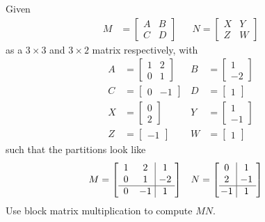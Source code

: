 \begin{exmp}
Given 
\begin{align*}
M &=
\begin{bmatrix}
A & B \\
C & D
\end{bmatrix} 
& &
N =
\begin{bmatrix}
X & Y \\
Z & W
\end{bmatrix} 
\end{align*}
as a $3 \times 3$ and $3 \times 2$ matrix respectively, with
\begin{align*}
A &= 
\begin{bmatrix}
1 & 2 \\
0 & 1
\end{bmatrix}
& 
B &=
\begin{bmatrix}
1 \\
-2
\end{bmatrix} \\
C &= 
\begin{bmatrix}
0 & -1 
\end{bmatrix}
&
D &=
\begin{bmatrix}
1
\end{bmatrix} \\
X &= 
\begin{bmatrix}
0 \\
2 
\end{bmatrix}
&
Y &=
\begin{bmatrix}
1 \\
-1
\end{bmatrix} \\
Z &= 
\begin{bmatrix}
-1
\end{bmatrix}
&
W &=
\begin{bmatrix}
1
\end{bmatrix} 
\end{align*}
such that the partitions look like
\begin{align*}
M &=
\left[\begin{array}{@{\;}wc{10pt}wc{10pt}|wc{10pt}}
1 & 2 & 1 \\
0 & 1 & -2 \\
\hline
0 & -1 & 1
\end{array}\right]
& &
N =
\left[\begin{array}{@{\;}wc{10pt}|wc{10pt}}
0 & 1 \\
2 & -1 \\
\hline
-1 & 1
\end{array}\right]   
\end{align*}
Use block matrix multiplication to compute $MN$.
\end{exmp}
